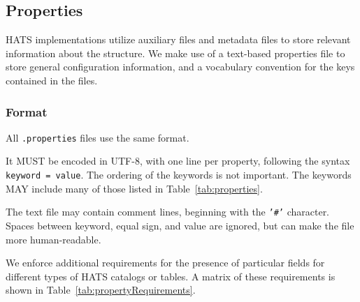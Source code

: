 \documentclass[11pt,a4paper]{ivoa}
\begin{document}
\subsection{Properties} \label{sec:meta}

HATS implementations utilize auxiliary files and metadata files to store relevant information about the structure.
We make use of a text-based properties file to store general configuration information, and a vocabulary convention for the keys contained in the files.

\subsubsection{Format} 

All \texttt{.properties} files use the same format.

It MUST be encoded in UTF-8, with one line per property, following the syntax \texttt{keyword = value}.
The ordering of the keywords is not important. The keywords MAY include many of those listed in Table~\ref{tab:properties}.

The text file may contain comment lines, beginning with the \texttt{'\#'} character. 
Spaces between keyword, equal sign, and value are ignored, but can make the file more human-readable.

We enforce additional requirements for the presence of particular fields for different types of HATS catalogs or tables. 
A matrix of these requirements is shown in Table~\ref{tab:propertyRequirements}.
\end{document}
